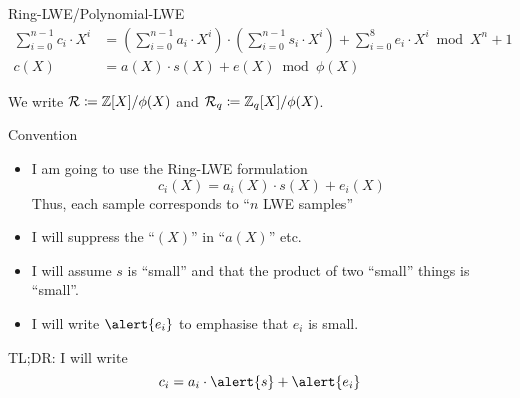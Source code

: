 \documentclass[xcolor=table,10pt,aspectratio=169]{beamer}
\providecommand{\ring}[0]{\ensuremath{\mathcal{R}}\xspace}
\providecommand{\ring}[0]{\ensuremath{\mathcal{R}}\xspace}
\begin{document}
\begin{frame}[label={sec:orgbeee0cc}]{Ring-LWE/Polynomial-LWE}
\begin{align*}
\sum_{i=0}^{n-1} c_{i} \cdot X^{i} &= \left(\sum_{i=0}^{n-1} a_{i} \cdot X^{i}\right) \cdot \left(\sum_{i=0}^{n-1} s_{i} \cdot X^{i}\right) + \sum_{i=0}^{8} e_{i} \cdot X^{i} \bmod X^{n} +1\\
c(X) &= a(X) \cdot s(X) + e(X) \bmod \phi(X)
\end{align*}

We write \(\ring \coloneqq \ZZ[X]/\phi(X)\) and \(\ring_{q} \coloneqq \ZZ_{q}[X]/\phi(X)\).

{\footnotesize {} \par}

{\footnotesize {} \par}
\end{frame}
\begin{frame}[label={sec:org7ac3625}]{Convention}
\begin{itemize}
\item I am going to use the Ring-LWE formulation \[c_{i}(X) = a_{i}(X)\cdot s(X) + e_{i}(X)\]
Thus, each sample corresponds to ``\(n\) LWE samples''
\item I will suppress the ``\((X)\)'' in ``\(a(X)\)'' etc.
\item I will assume \(s\) is ``small'' and that the product of two ``small'' things is ``small''.
\item I will write \(\alert{e_{i}}\) to emphasise that \(e_{i}\) is small.
\end{itemize}
\begin{block}{TL;DR: I will write}
\[c_{i} = a_{i}\cdot \alert{s} + \alert{e_{i}}\]
\end{block}
\end{frame}
\end{document}
